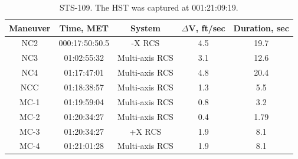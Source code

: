 \documentclass[paper=letter, fontsize=11pt]{scrartcl} %
\numberwithin{equation}{section} %
\numberwithin{figure}{section} %
\numberwithin{table}{section} %
\begin{document}
\begin{table}[H]
    \begin{center}
        \begin{tabular}{|c |c |c |c |c|}
            \hline
            Maneuver & Time, MET      & System         & $\Delta$V, ft/sec & Duration, sec \\
            \hline
            NC2      & 000:17:50:50.5 & -X RCS         & 4.5               & 19.7          \\ \hline
            NC3      & 01:02:55:32    & Multi-axis RCS & 3.1               & 12.6          \\ \hline
            NC4      & 01:17:47:01    & Multi-axis RCS & 4.8               & 20.4          \\ \hline
            NCC      & 01:18:38:57    & Multi-axis RCS & 1.3               & 5.5           \\ \hline
            MC-1     & 01:19:59:04    & Multi-axis RCS & 0.8               & 3.2           \\ \hline
            MC-2     & 01:20:34:27    & Multi-axis RCS & 0.4               & 1.79          \\ \hline
            MC-3     & 01:20:34:27    & +X RCS         & 1.9               & 8.1           \\ \hline
            MC-4     & 01:21:01:28    & Multi-axis RCS & 1.9               & 8.1           \\ \hline
        \end{tabular}
    \end{center}
    \caption{STS-109. The HST was captured at 001:21:09:19.}
\end{table}

\end{document}
